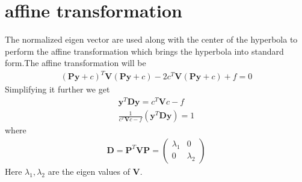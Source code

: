 \documentclass[journal,12pt,twocolumn]{IEEEtran}
\providecommand{\brak}[1]{\ensuremath{\left(#1\right)}}
\newcommand{\myvec}[1]{\ensuremath{\begin{pmatrix}#1\end{pmatrix}}}
\numberwithin{equation}{subsection}
\let\vec\mathbf
\begin{document}
\section{affine transformation}
The normalized eigen vector are used along with the center of the hyperbola to perform the affine transformation which brings the hyperbola into standard form.The affine transformation will be
\begin{align}
    \brak{\vec{P}\vec{y}+c}^T\vec{V}\brak{\vec{P}\vec{y}+c}-2c^T\vec{V}\brak{\vec{P}\vec{y}+c}+f=0
\end{align}
Simplifying it further we get
\begin{align}
    \vec{y}^T\vec{D}\vec{y}=c^T\vec{V}c-f\\
    \frac{1}{c^T\vec{V}c-f}\brak{\vec{y}^T\vec{D}\vec{y}}=1\label{eq:3.1}
\end{align}
where
\begin{align}
    \vec{D}=\vec{P}^T\vec{V}\vec{P}=\myvec{\lambda_1&0\\0&\lambda_2}
\end{align}
Here $\lambda_1,\lambda_2$ are the eigen values of $\vec{V}$.
\end{document}
